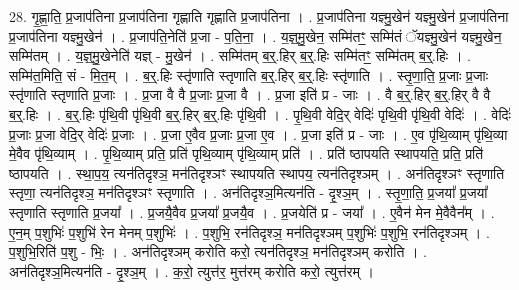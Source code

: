 \documentclass[17pt]{extarticle}
\begin{document}
28. गृ॒ह्णा॒ति॒ प्र॒जाप॑तिना प्र॒जाप॑तिना गृह्णाति गृह्णाति प्र॒जाप॑तिना । . प्र॒जाप॑तिना यज्ञ्मु॒खेन॑ यज्ञ्मु॒खेन॑ प्र॒जाप॑तिना प्र॒जाप॑तिना यज्ञ्मु॒खेन॑ । . प्र॒जाप॑ति॒नेति॑ प्र॒जा - प॒ति॒ना॒ । . य॒ज्ञ्॒मु॒खेन॒ सम्मि॑तꣳ॒॒ सम्मि॑तं ॅयज्ञ्मु॒खेन॑ यज्ञ्मु॒खेन॒ सम्मि॑तम् । . य॒ज्ञ्॒मु॒खेनेति॑ यज्ञ् - मु॒खेन॑ । . सम्मि॑तम् ब॒र्॒.हिर् ब॒र्॒.हिः सम्मि॑तꣳ॒॒ सम्मि॑तम् ब॒र्॒.हिः । . सम्मि॑त॒मिति॒ सं - मि॒त॒म् । . ब॒र्॒.हिः स्तृ॑णाति स्तृणाति ब॒र्॒.हिर् ब॒र्॒.हिः स्तृ॑णाति । . स्तृ॒णा॒ति॒ प्र॒जाः प्र॒जाः स्तृ॑णाति स्तृणाति प्र॒जाः । . प्र॒जा वै वै प्र॒जाः प्र॒जा वै । . प्र॒जा इति॑ प्र - जाः । . वै ब॒र्॒.हिर् ब॒र्॒.हिर् वै वै ब॒र्॒.हिः । . ब॒र्॒.हिः पृ॑थि॒वी पृ॑थि॒वी ब॒र्॒.हिर् ब॒र्॒.हिः पृ॑थि॒वी । . पृ॒थि॒वी वेदि॒र् वेदिः॑ पृथि॒वी पृ॑थि॒वी वेदिः॑ । . वेदिः॑ प्र॒जाः प्र॒जा वेदि॒र् वेदिः॑ प्र॒जाः । . प्र॒जा ए॒वैव प्र॒जाः प्र॒जा ए॒व । . प्र॒जा इति॑ प्र - जाः । . ए॒व पृ॑थि॒व्याम् पृ॑थि॒व्या मे॒वैव पृ॑थि॒व्याम् । . पृ॒थि॒व्याम् प्रति॒ प्रति॑ पृथि॒व्याम् पृ॑थि॒व्याम् प्रति॑ । . प्रति॑ ष्ठापयति स्थापयति॒ प्रति॒ प्रति॑ ष्ठापयति । . स्था॒प॒य॒ त्यन॑तिदृश्ञ॒ मन॑तिदृश्ञꣳ स्थापयति स्थापय॒ त्यन॑तिदृश्ञम् । . अन॑तिदृश्ञꣳ स्तृणाति स्तृणा॒ त्यन॑तिदृश्ञ॒ मन॑तिदृश्ञꣳ स्तृणाति । . अन॑तिदृश्ञ॒मित्यन॑ति - दृ॒श्ञ॒म् । . स्तृ॒णा॒ति॒ प्र॒जया᳚ प्र॒जया᳚ स्तृणाति स्तृणाति प्र॒जया᳚ । . प्र॒जयै॒वैव प्र॒जया᳚ प्र॒जयै॒व । . प्र॒जयेति॑ प्र - जया᳚ । . ए॒वैन॑ मेन मे॒वैवैन᳚म् । . ए॒न॒म् प॒शुभिः॑ प॒शुभि॑ रेन मेनम् प॒शुभिः॑ । . प॒शुभि॒ रन॑तिदृश्ञ॒ मन॑तिदृश्ञम् प॒शुभिः॑ प॒शुभि॒ रन॑तिदृश्ञम् । . प॒शुभि॒रिति॑ प॒शु - भिः॒ । . अन॑तिदृश्ञम् करोति करो॒ त्यन॑तिदृश्ञ॒ मन॑तिदृश्ञम् करोति । . अन॑तिदृश्ञ॒मित्यन॑ति - दृ॒श्ञ॒म् । . क॒रो॒ त्युत्त॑र॒ मुत्त॑रम् करोति करो॒ त्युत्त॑रम् । \newline
\end{document}
